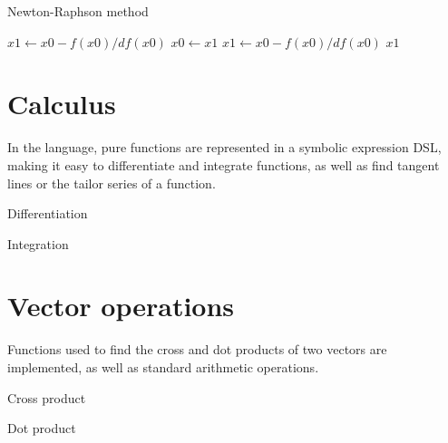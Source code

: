 \documentclass[a4paper, oneside, 11pt]{report}
\begin{document}
\begin{algorithm}
    \caption{Newton-Raphson method}
    \begin{algorithmic}
            \State $x1 \gets x0 - f(x0) / df(x0)$
                \State $x0 \gets x1$
                \State $x1 \gets x0 - f(x0) / df(x0)$
            \EndWhile
            \State \Return $x1$
        \EndFunction
    \end{algorithmic}\label{alg:algorithm3}
\end{algorithm}
    
\section{Calculus}\label{sec:integration}
In the language, pure functions are represented in a symbolic expression DSL, making it easy to differentiate and 
integrate functions, as well as find tangent lines or the tailor series of a function.
    
\begin{algorithm}
    \caption{Differentiation}
    \begin{algorithmic}
    \end{algorithmic}\label{alg:algorithm4}
\end{algorithm}
    
\begin{algorithm}
    \caption{Integration}
    \begin{algorithmic}
    \end{algorithmic}\label{alg:algorithm5}
\end{algorithm}
    
\section{Vector operations}\label{sec:vector-ops}

Functions used to find the cross and dot products of two vectors are implemented, as well as standard arithmetic
operations.

\begin{algorithm}
    \caption{Cross product}
    \begin{algorithmic}
    \end{algorithmic}\label{alg:algorithm6}
\end{algorithm}

\begin{algorithm}
    \caption{Dot product}
    \begin{algorithmic}
    \end{algorithmic}\label{alg:algorithm7}
\end{algorithm}
\end{document}

